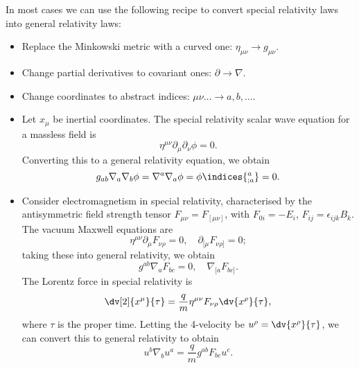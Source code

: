 \documentclass{jknotes}
\begin{document}
In most cases we can use the following recipe to convert special relativity laws into general relativity laws:
\begin{itemize}
    \item Replace the Minkowski metric with a curved one: \(\eta_{\mu\nu} \to g_{\mu\nu}\).
    \item Change partial derivatives to covariant ones: \(\partial \to \nabla\).
    \item Change coordinates to abstract indices: \(\mu\nu\dots \to a,b,\dots\).
\end{itemize}
\begin{eg}
    \begin{itemize}
        \item Let \(x_\mu\) be inertial coordinates. The special relativity scalar wave equation for a massless field is
            \begin{equation}
                \eta^{\mu\nu}\partial_\mu\partial_\nu \phi = 0.
            \end{equation}
            Converting this to a general relativity equation, we obtain
            \begin{equation}
                g_{ab} \nabla_a\nabla_b\phi = \nabla^a\nabla_a \phi = \phi\indices{_{;a}^a} = 0.
            \end{equation}
        \item Consider electromagnetism in special relativity, characterised by the antisymmetric field strength tensor \(F_{\mu\nu} = F_{[\mu\nu]}\), with \(F_{0i} = -E_i\), \(F_{ij} = \epsilon_{ijk}B_k\). The vacuum Maxwell equations are
            \begin{equation}
                \eta^{\mu\nu} \partial_\mu F_{\nu\rho} = 0,\quad \partial_{[\mu}F_{\nu\rho]} = 0;
            \end{equation}
            taking these into general relativity, we obtain
            \begin{equation}
                g^{ab}\nabla_aF_{bc} = 0,\quad \nabla_{[a}F_{bc]}.
            \end{equation}
            The Lorentz force in special relativity is
            \begin{equation}
                \dv[2]{x^\mu}{\tau} = \frac{q}{m}\eta^{\mu\nu}F_{\nu\rho}\dv{x^\rho}{\tau},
            \end{equation}
            where \(\tau\) is the proper time. Letting the 4-velocity be \(u^\rho = \dv{x^\rho}{\tau}\), we can convert this to general relativity to obtain
            \begin{equation}
                u^b\nabla_b u^a = \frac{q}{m}g^{ab}F_{bc}u^c.
            \end{equation}
    \end{itemize}
\end{eg}
\end{document}
